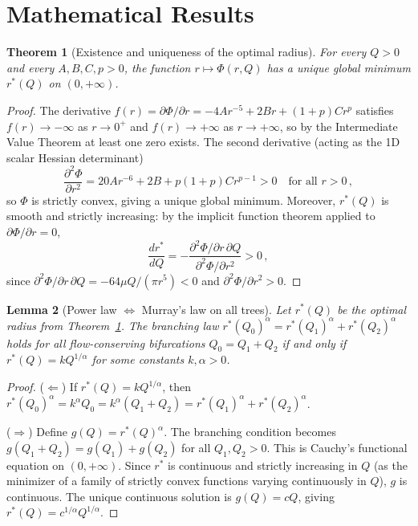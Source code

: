\documentclass[11pt,a4paper]{article}
\newtheorem{theorem}{Theorem}
\newtheorem{lemma}[theorem]{Lemma}
\theoremstyle{remark}
\begin{document}
\section{Mathematical Results}
\label{sec:results}

\begin{theorem}[Existence and uniqueness of the optimal radius]
\label{thm:unique}
For every $Q>0$ and every $A,B,C,p>0$, the function $r\mapsto\Phi(r,Q)$
has a unique global minimum $r^*(Q)$ on $(0,+\infty)$.
\end{theorem}

\begin{proof}
The derivative $f(r)=\partial\Phi/\partial r = -4Ar^{-5}+2Br+(1+p)Cr^p$
satisfies $f(r)\to-\infty$ as $r\to0^+$ and $f(r)\to+\infty$ as $r\to+\infty$,
so by the Intermediate Value Theorem at least one zero exists.
The second derivative (acting as the 1D scalar Hessian determinant)
\[
  \frac{\partial^2\Phi}{\partial r^2} = 20A r^{-6} + 2B + p(1+p)Cr^{p-1} > 0
  \quad\text{for all }r>0\,,
\]
so $\Phi$ is strictly convex, giving a unique global minimum.
Moreover, $r^*(Q)$ is smooth and strictly increasing: by the implicit function
theorem applied to $\partial\Phi/\partial r=0$,
\[
  \frac{dr^*}{dQ} = -\frac{\partial^2\Phi/\partial r\,\partial Q}{\partial^2\Phi/\partial r^2} > 0\,,
\]
since $\partial^2\Phi/\partial r\,\partial Q = -64\mu Q/(\pi r^5) < 0$ and
$\partial^2\Phi/\partial r^2 > 0$.
\end{proof}

\begin{lemma}[Power law $\Leftrightarrow$ Murray's law on all trees]
\label{lem:cauchy}
Let $r^*(Q)$ be the optimal radius from Theorem~\ref{thm:unique}.
The branching law $r^*(Q_0)^\alpha = r^*(Q_1)^\alpha + r^*(Q_2)^\alpha$ holds
for \emph{all} flow-conserving bifurcations $Q_0=Q_1+Q_2$ if and only if
$r^*(Q)=kQ^{1/\alpha}$ for some constants $k,\alpha>0$.
\end{lemma}

\begin{proof}
($\Leftarrow$) If $r^*(Q)=kQ^{1/\alpha}$, then
$r^*(Q_0)^\alpha = k^\alpha Q_0 = k^\alpha(Q_1+Q_2)
= r^*(Q_1)^\alpha+r^*(Q_2)^\alpha$.

($\Rightarrow$) Define $g(Q)=r^*(Q)^\alpha$.
The branching condition becomes $g(Q_1+Q_2)=g(Q_1)+g(Q_2)$ for all $Q_1,Q_2>0$.
This is Cauchy's functional equation on $(0,+\infty)$.
Since $r^*$ is continuous and strictly increasing in $Q$ (as the minimizer
of a family of strictly convex functions varying continuously in $Q$),
$g$ is continuous.
The unique continuous solution is $g(Q)=cQ$, giving
$r^*(Q)=c^{1/\alpha}Q^{1/\alpha}$.
\end{proof}
\end{document}

